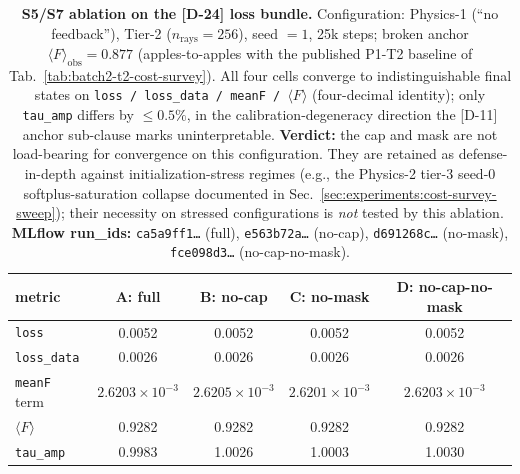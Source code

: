 \begin{table}[t]
    \centering
    \renewcommand{\arraystretch}{1.15}
    \setlength{\tabcolsep}{4pt}
    \begin{tabular}{l|cccc}
    metric & A: full & B: no-cap & C: no-mask & D: no-cap-no-mask \\
    \hline
    \texttt{loss}        & 0.0052      & 0.0052      & 0.0052      & 0.0052      \\
    \texttt{loss\_data}  & 0.0026      & 0.0026      & 0.0026      & 0.0026      \\
    \texttt{meanF} term  & $2.6203\!\times\!10^{-3}$ & $2.6205\!\times\!10^{-3}$ & $2.6201\!\times\!10^{-3}$ & $2.6203\!\times\!10^{-3}$ \\
    $\langle F\rangle$   & 0.9282      & 0.9282      & 0.9282      & 0.9282      \\
    \texttt{tau\_amp}    & 0.9983      & 1.0026      & 1.0003      & 1.0030      \\
    \end{tabular}
    \caption{\textbf{S5/S7 ablation on the [D-24] loss bundle.} Configuration: Physics-1 (``no feedback''), Tier-2 ($n_{\text{rays}}=256$), seed $=1$, 25k steps; broken anchor $\langle F\rangle_{\text{obs}}=0.877$ (apples-to-apples with the published P1-T2 baseline of Tab.~\ref{tab:batch2-t2-cost-survey}). All four cells converge to indistinguishable final states on \texttt{loss / loss\_data / meanF / $\langle F\rangle$} (four-decimal identity); only \texttt{tau\_amp} differs by $\leq 0.5\%$, in the calibration-degeneracy direction the [D-11] anchor sub-clause marks uninterpretable. \textbf{Verdict:} the cap and mask are not load-bearing for convergence on this configuration. They are retained as defense-in-depth against initialization-stress regimes (e.g., the Physics-2 tier-3 seed-0 softplus-saturation collapse documented in Sec.~\ref{sec:experiments:cost-survey-sweep}); their necessity on stressed configurations is \emph{not} tested by this ablation. \textbf{MLflow run\_ids:} \texttt{ca5a9ff1\dots} (full), \texttt{e563b72a\dots} (no-cap), \texttt{d691268c\dots} (no-mask), \texttt{fce098d3\dots} (no-cap-no-mask).}
    \label{tab:s5s7-ablation}
\end{table}

